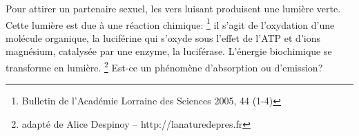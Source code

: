 
%
%
%
%
%
%
%
%
%
%
%
%


Pour attirer un partenaire sexuel, les vers luisant produisent une lumière verte.
Cette lumière est due à une réaction chimique:
\footnote{Bulletin de l'Académie Lorraine des Sciences 2005, 44 (1-4)}
il s’agit de l'oxydation d'une molécule organique, la luciférine qui s'oxyde sous l’effet de l’ATP
et d’ions magnésium, catalysée par une enzyme, la luciférase.
L’énergie biochimique se transforme en lumière.
\footnote{adapté de Alice Despinoy – http://lanaturedepres.fr}
	Est-ce un phénomène d'absorption ou d'emission?

